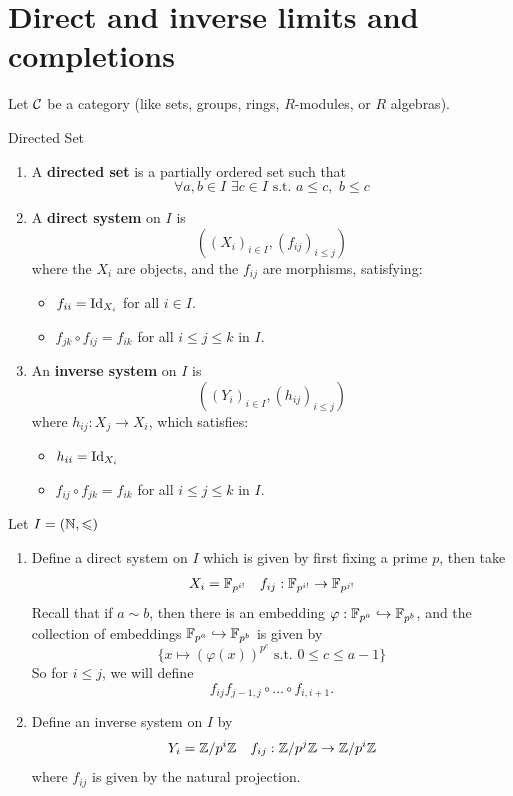 \documentclass{article}
\begin{document}
\section{Direct and inverse limits and completions}
Let $\mathcal{C}$ be a category (like sets, groups, rings, $R$-modules, or $R$ algebras).
\begin{fancydefine}{Directed Set}
    \hspace{0.1cm}\begin{enumerate}
        \item A \textbf{directed set} is a partially ordered set such that \[ \forall a,b \in I \,\, \exists c \in I \text{ s.t. } a \leq c, \,\, b \leq c\]
        \item A \textbf{direct system} on $I$ is \[ ((X_{i})_{i \in I}, (f_{ij})_{i \leq j})\] where the $X_{i}$ are objects, and the $f_{ij}$ are morphisms, satisfying: \begin{itemize}
            \item $f_{ii} = \operatorname{Id}_{X_{i}}$ for all $i \in I$.
            \item $f_{jk} \circ f_{ij} = f_{ik}$ for all $i \leq j \leq k$ in $I$.
        \end{itemize}
        \item An \textbf{inverse system} on $I$ is \[ ((Y_{i})_{i \in I}, (h_{ij})_{i \leq j})\] where $h_{ij} : X_{j} \to X_{i}$, which satisfies: \begin{itemize}
            \item $h_{ii} = \operatorname{Id}_{X_{i}}$
            \item $f_{ij} \circ f_{jk} = f_{ik}$ for all $i \leq j \leq k$ in $I$.
        \end{itemize}
    \end{enumerate}
\end{fancydefine}
\begin{ex*}
    Let $I = (\mathbb{N}, \leqslant)$ \begin{enumerate}
        \item Define a direct system on $I$ which is given by first fixing a prime $p$, then take \begin{align*} 
            X_{i} = \mathbb{F}_{p^{i!}} & & f_{ij}: \mathbb{F}_{p^{i!}} \to \mathbb{F}_{p^{j!}}
        \end{align*}
        Recall that if $a \sim b$, then there is an embedding $\varphi : \mathbb{F}_{p^{a}} \hookrightarrow \mathbb{F}_{p^{b}}$, and the collection of embeddings $\mathbb{F}_{p^{a}} \hookrightarrow \mathbb{F}_{p^{b}}$ is given by \[ \{x \mapsto (\varphi(x))^{p^{c}} \text{ s.t. } 0 \leq c \leq a-1\}\]
        So for $i \leq j$, we will define \[ f_{ij} f_{j-1, j} \circ \dots \circ f_{i,i+1}.\]
        \item Define an inverse system on $I$ by \begin{align*}
            Y_{i} = \mathbb{Z}/p^{i}\mathbb{Z} & & f_{ij} : \mathbb{Z}/p^{j}\mathbb{Z} \to \mathbb{Z}/p^{i}\mathbb{Z}
        \end{align*}
        where $f_{ij}$ is given by the natural projection.
    \end{enumerate}
\end{ex*}
\end{document}
